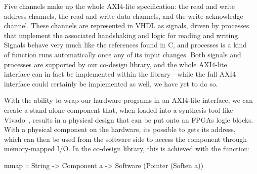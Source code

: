 \documentclass[../main.tex]{subfiles}
\begin{document}

Five channels make up the whole AXI4-lite specification: the read and write address channels, the read and write data channels, and the write acknowledge channel. These channels are represented in VHDL as signals, driven by processes that implement the associated handshaking and logic for reading and writing. Signals behave very much like the references found in C, and processes is a kind of function runs automatically once any of its input changes. Both signals and processes are supported by our co-design library, and the whole AXI4-lite interface can in fact be implemented within the library---while the full AXI4 interface could certainly be implemented as well, we have yet to do so.


With the ability to wrap our hardware programs in an AXI4-lite interface, we can create a stand-alone component that, when loaded into a synthesis tool like Vivado~\cite{feist2012}, results in a physical design that can be put onto an FPGAs logic blocks. With a physical component on the hardware, its possible to gets its address, which can then be used from the software side to access the component through memory-mapped I/O. In the co-design library, this is achieved with the  function:

\begin{code}
mmap :: String -> Component a -> Software (Pointer (Soften a))
\end{code}
\end{document}
